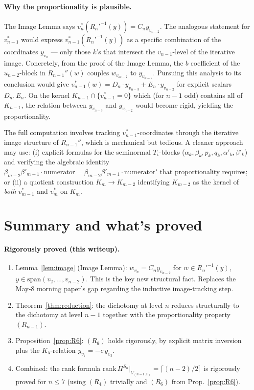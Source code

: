 \documentclass[11pt]{article}
\theoremstyle{definition}
\begin{document}
\paragraph{Why the proportionality is plausible.}
The Image Lemma says $v_n^*(R_n'^{-1}(y)) = C_n y_{v_{n-2}}$. The
analogous statement for $v_{n-1}^*$ would express
$v_{n-1}^*(R_n'^{-1}(y))$ as a specific combination of the
coordinates $y_{v_k}$ — only those $k$'s that intersect the
$v_{n-1}$-level of the iterative image. Concretely, from the
proof of the Image Lemma, the $b$ coefficient of the
$u_{n-2}$-block in $R_{n-1}''(w)$ couples $w_{v_{m-2}}$ to
$y_{v_{n-2}}$. Pursuing this analysis to its conclusion would give
$v_{n-1}^*(w) = D_n \cdot y_{v_{n-3}} + E_n \cdot y_{v_{n-2}}$
for explicit scalars $D_n, E_n$. On the kernel
$K_{n-1} \cap \{v_{n-1}^*=0\}$ which (for $n-1$ odd) contains
all of $K_{n-1}$, the relation between $y_{v_{n-3}}$ and
$y_{v_{n-2}}$ would become rigid, yielding the proportionality.

The full computation involves tracking $v_{n-1}^*$-coordinates
through the iterative image structure of $R_{n-1}''$, which is
mechanical but tedious. A cleaner approach may use:
(i) explicit formulas for the seminormal $T_i$-blocks
($\alpha_k, \beta_k, p_k, q_k, \alpha'_k, \beta'_k$) and verifying
the algebraic identity $\beta_{m-2}\beta'_{m-1} \cdot \mathrm{numerator} =
\beta_{m-2}\beta'_{m-1} \cdot \mathrm{numerator}'$ that
proportionality requires; or
(ii) a quotient construction $K_m \to K_{m-2}$ identifying $K_{m-2}$ as
the kernel of \emph{both} $v_{m-1}^*$ and $v_m^*$ on $K_m$.

\section{Summary and what's proved}\label{sec:summary}

\paragraph{Rigorously proved (this writeup).}
\begin{enumerate}[topsep=0.3em,itemsep=0.2em,leftmargin=2em]
\item Lemma~\ref{lem:image} (Image Lemma): $w_{v_n} = C_n y_{v_{n-2}}$
  for $w \in R_n'^{-1}(y)$, $y \in \mathrm{span}(v_2,\ldots,v_{n-2})$.
  This is the key new structural fact. Replaces the May-8 morning
  paper's gap regarding the inductive image-tracking step.
\item Theorem~\ref{thm:reduction}: the dichotomy at level $n$
  reduces structurally to the dichotomy at level $n-1$ together
  with the proportionality property $(R_{n-1})$.
\item Proposition~\ref{prop:R6}: $(R_6)$ holds rigorously,
  by explicit matrix inversion plus the $K_5$-relation
  $y_{v_4} = -c\, y_{v_3}$.
\item Combined: the rank formula
  $\mathrm{rank}\,\Pi^{S_n}|_{V_{(n-1,1)}} = \lceil(n-2)/2\rceil$ is
  rigorously proved for $n \le 7$ (using $(R_4)$ trivially and
  $(R_6)$ from Prop.~\ref{prop:R6}).
\end{enumerate}
\end{document}
